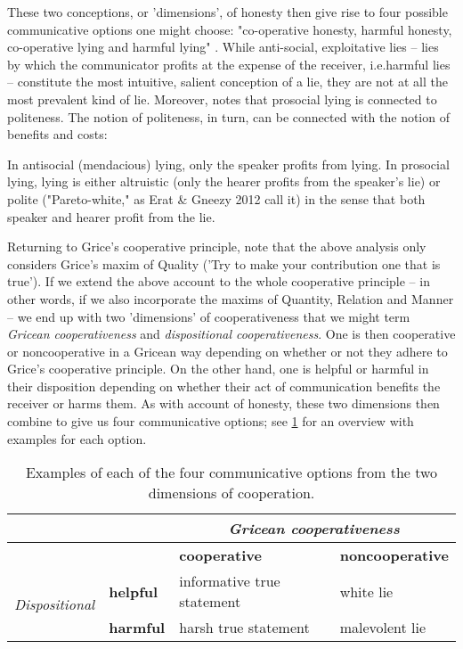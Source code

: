 These two conceptions, or 'dimensions', of honesty then give rise to four possible communicative options one might choose: "co-operative honesty, harmful honesty, co-operative lying and harmful lying" \citep[p.~45]{Dor17}.
While anti-social, exploitative lies -- lies by which the communicator profits at the expense of the receiver, i.e.\@ harmful lies -- constitute the most intuitive, salient conception of a lie, they are not at all the most prevalent kind of lie. Moreover, \citet{Meibauer18} notes that prosocial lying is connected to politeness. The notion of politeness, in turn, can be connected with the notion of benefits and costs:
\begin{quoting}
    In antisocial (mendacious) lying, only the speaker profits from lying. In prosocial lying, lying is either altruistic (only the hearer profits from the speaker's lie) or polite ("Pareto-white," as Erat \& Gneezy 2012 call it) in the sense that both speaker and hearer profit from the lie.
    \hfill \citep[p.~371]{Meibauer18}
\end{quoting}

Returning to Grice's cooperative principle, note that the above analysis only considers Grice's maxim of Quality ('Try to make your contribution one that is true'). If we extend the above account to the whole cooperative principle -- in other words, if we also incorporate the maxims of Quantity, Relation and Manner -- we end up with two 'dimensions' of cooperativeness that we might term \emph{Gricean cooperativeness} and \emph{dispositional cooperativeness}. One is then cooperative or noncooperative in a Gricean way depending on whether or not they adhere to Grice's cooperative principle. On the other hand, one is helpful or harmful in their disposition depending on whether their act of communication benefits the receiver or harms them.
As with  account of honesty,
these two dimensions then combine to give us four communicative options; see \cref{tab:dimensions-of-cooperation} for an overview with examples for each option.

\begin{table}[ht]
  \centering
\begin{tabular}{rlll}
  \hline
  & & \multicolumn{2}{c}{\emph{Gricean cooperativeness}} \\ \hline
  & & \textbf{cooperative} & \textbf{noncooperative} \\ \hline
  \multirow{2}{*}{\emph{Dispositional}} &
  \textbf{helpful} & informative true statement & white lie \\ \hline
                   & \textbf{harmful} & harsh true statement & malevolent lie \\ \hline
\end{tabular}
\caption{Examples of each of the four communicative options from the two dimensions of cooperation.}
\label{tab:dimensions-of-cooperation}
\end{table}

